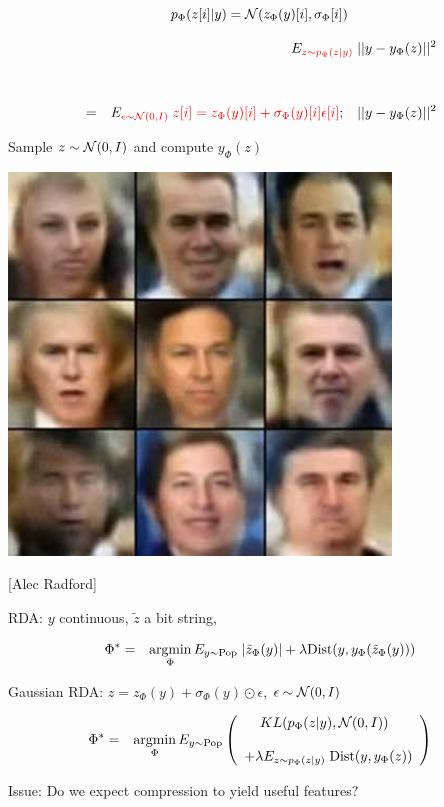{

$$p_\Phi(z[i]|y) = {\cal N}(z_\Phi(y)[i],\sigma_\Phi[i])$$

\vfill
\begin{eqnarray*}
& & E_{\color{red} z \sim p_\Phi(z|y)} \;||y - y_\Phi(z)||^2 \\
\\
\\
& = & E_{\color{red} \epsilon \sim {\cal N}(0,I)} \;{\color{red} z[i] = z_\Phi(y)[i] + \sigma_\Phi(y)[i]\epsilon[i]};\;\; \;||y -y_\Phi(z)||^2
\end{eqnarray*}


\centerline{Sample {\color{red} $z \sim {\cal N}(0,I)$} and compute {\color{red} $y_\Phi(z)$}}
\vfill
\centerline{\includegraphics[width = 4in]{../images/VariationalFaces}}
\centerline{[Alec Radford]}



RDA: $y$ continuous, $\tilde{z}$ a bit string,

{\color{red}
\begin{eqnarray*}
\Phi^* &  = &  \operatorname*{argmin}_\Phi E_{y \sim \mathrm{Pop}} \;|\tilde{z}_\Phi(y)| + \lambda \mathrm{Dist}(y,y_\Phi(\tilde{z}_\Phi(y)))
\end{eqnarray*}
}

\vfill
Gaussian RDA: {\color{red} $z = z_\Phi(y) + \sigma_\Phi(y) \odot \epsilon$,\hspace{2em} $\epsilon \sim {\cal N}(0,I)$}

{\color{red}
\begin{eqnarray*}
\Phi^* & = & \operatorname*{argmin}_\Phi E_{y \sim \mathrm{Pop}}\left(\begin{array}{l}\;\;\; \;KL(p_\Phi(z|y),{\cal N}(0,I)) \\ \\ + \lambda E_{z\sim p_\Phi(z|y)}\; \mathrm{Dist}(y,y_\Phi(z)) \end{array}\right)
\end{eqnarray*}
}

\vfill
Issue: Do we expect compression to yield useful features?


}



